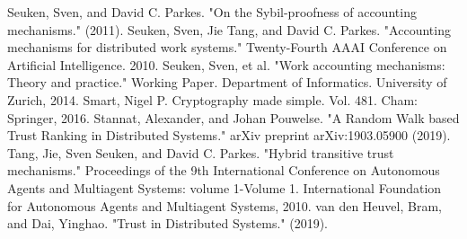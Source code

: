 \documentclass[11pt,a4paper]{article}
\theoremstyle{definition}
\theoremstyle{theorem}
\theoremstyle{proposition}
\theoremstyle{corollary}
\theoremstyle{lemma}
\theoremstyle{example}
\theoremstyle{remark}
\begin{document}
\begin{thebibliography}{9}
Seuken, Sven, and David C. Parkes. "On the Sybil-proofness of accounting mechanisms." (2011).
Seuken, Sven, Jie Tang, and David C. Parkes. "Accounting mechanisms for distributed work systems." Twenty-Fourth AAAI Conference on Artificial Intelligence. 2010.
Seuken, Sven, et al. "Work accounting mechanisms: Theory and practice." Working Paper. Department of Informatics. University of Zurich, 2014.
Smart, Nigel P. Cryptography made simple. Vol. 481. Cham: Springer, 2016.
Stannat, Alexander, and Johan Pouwelse. "A Random Walk based Trust Ranking in Distributed Systems." arXiv preprint arXiv:1903.05900 (2019).
Tang, Jie, Sven Seuken, and David C. Parkes. "Hybrid transitive trust mechanisms." Proceedings of the 9th International Conference on Autonomous Agents and Multiagent Systems: volume 1-Volume 1. International Foundation for Autonomous Agents and Multiagent Systems, 2010.
van den Heuvel, Bram, and Dai, Yinghao. "Trust in Distributed Systems." (2019).  







\end{thebibliography}
\end{document}
